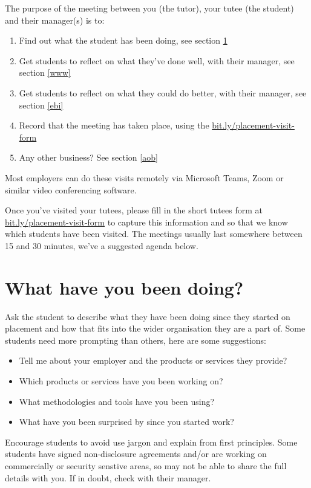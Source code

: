 \documentclass[
]{book}
\providecommand{\tightlist}{%
  \setlength{\itemsep}{0pt}\setlength{\parskip}{0pt}}
\begin{document}
The purpose of the meeting between you (the tutor), your tutee (the student) and their manager(s) is to:

\begin{enumerate}
\def\labelenumi{\arabic{enumi}.}
\tightlist
\item
  Find out what the student has been doing, see section \ref{what}
\item
  Get students to reflect on what they've done well, with their manager, see section \ref{www}
\item
  Get students to reflect on what they could do better, with their manager, see section \ref{ebi}
\item
  Record that the meeting has taken place, using the \url{bit.ly/placement-visit-form} \citep{visitform}
\item
  Any other business? See section \ref{aob}
\end{enumerate}

Most employers can do these visits remotely via Microsoft Teams, Zoom or similar video conferencing software.

Once you've visited your tutees, please fill in the short tutees form at \url{bit.ly/placement-visit-form} \citep{visitform} to capture this information and so that we know which students have been visited. The meetings usually last somewhere between 15 and 30 minutes, we've a suggested agenda below.

\section{What have you been doing?}\label{what}

Ask the student to describe what they have been doing since they started on placement and how that fits into the wider organisation they are a part of. Some students need more prompting than others, here are some suggestions:

\begin{itemize}
\tightlist
\item
  Tell me about your employer and the products or services they provide?
\item
  Which products or services have you been working on?
\item
  What methodologies and tools have you been using?
\item
  What have you been surprised by since you started work?
\end{itemize}

Encourage students to avoid use jargon and explain from first principles. Some students have signed non-disclosure agreements and/or are working on commercially or security senstive areas, so may not be able to share the full details with you. If in doubt, check with their manager.
\end{document}
